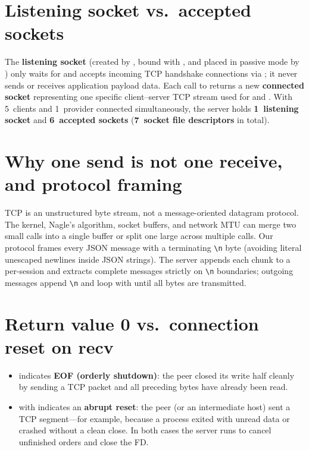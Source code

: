 \documentclass{../latex/utmreport}
\begin{document}
\section{Listening socket vs.\ accepted sockets}
The \textbf{listening socket} (created by , bound with , and placed in passive mode by ) only waits for and accepts incoming TCP handshake connections via ; it never sends or receives application payload data. Each call to  returns a new \textbf{connected socket} representing one specific client--server TCP stream used for  and . With 5~clients and 1~provider connected simultaneously, the server holds \textbf{1~listening socket} and \textbf{6~accepted sockets} (\textbf{7~socket file descriptors} in total).

\section{Why one send is not one receive, and protocol framing}
TCP is an unstructured byte stream, not a message-oriented datagram protocol. The kernel, Nagle's algorithm, socket buffers, and network MTU can merge two small  calls into a single  buffer or split one large  across multiple  calls. Our protocol frames every JSON message with a terminating \texttt{\textbackslash n} byte (avoiding literal unescaped newlines inside JSON strings). The server appends each  chunk to a per-session  and extracts complete messages strictly on \texttt{\textbackslash n} boundaries; outgoing messages append \texttt{\textbackslash n} and loop with  until all bytes are transmitted.

\section{Return value 0 vs.\ connection reset on recv}
\begin{itemize}
  \item {} indicates \textbf{EOF (orderly shutdown)}: the peer closed its write half cleanly by sending a TCP  packet and all preceding bytes have already been read.
  \item {} with  indicates an \textbf{abrupt reset}: the peer (or an intermediate host) sent a TCP  segment---for example, because a process exited with unread data or crashed without a clean close. In both cases the server runs  to cancel unfinished orders and close the FD.
\end{itemize}
\end{document}
